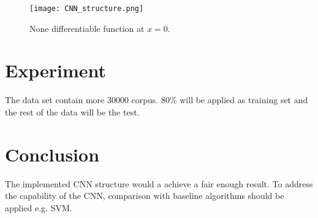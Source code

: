 \documentclass[a4paper]{article}
\begin{document}
\begin{figure}
\begin{center}
\texttt{[image: CNN\_structure.png]}
\end{center}
\caption{None differentiable function at $x=0$.}\label{cnn}
\end{figure}

\section{Experiment}\label{exp}

The data set contain more 30000 corpus. 80\% will be applied as training set and the rest of the data will be the test.

\section{Conclusion}\label{conclusion}
The implemented CNN structure would a achieve a fair enough result. To address the capability of the CNN, comparison with baseline algorithms should be applied e.g. SVM.



\end{document}
